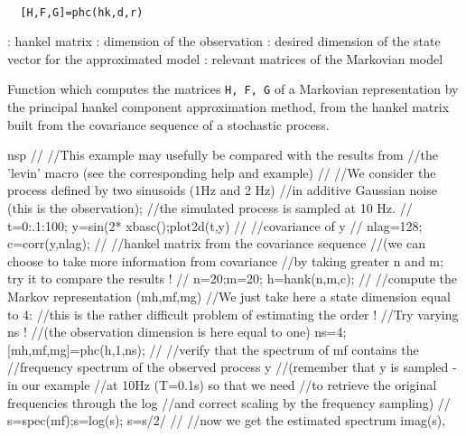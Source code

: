 \begin{mandesc}
   \\ %
\end{mandesc}
\begin{calling_sequence}
\begin{verbatim}
  [H,F,G]=phc(hk,d,r)  
\end{verbatim}
\end{calling_sequence}
\begin{parameters}
  \begin{varlist}
    : hankel matrix
    : dimension of the observation
    : desired dimension of the state vector for the approximated model
    : relevant matrices of the Markovian model
  \end{varlist}
\end{parameters}
\begin{mandescription}
  Function which computes the matrices \verb!H, F, G! of a Markovian 
  representation by the principal hankel
  component approximation method, from the hankel matrix built
  from the covariance sequence of a stochastic process.
\end{mandescription}
\begin{examples}
  \begin{mintednsp}{nsp}
    //
    //This example may usefully be compared with the results from 
    //the 'levin' macro (see the corresponding help and example)
    //
    //We consider the process defined by two sinusoids (1Hz and 2 Hz) 
    //in additive Gaussian noise (this is the observation); 
    //the simulated process is sampled at 10 Hz.
    //
    t=0:.1:100;
    y=sin(2*%
    xbasc();plot2d(t,y)
    //
    //covariance of y
    //
    nlag=128;
    c=corr(y,nlag);
    //
    //hankel matrix from the covariance sequence
    //(we can choose to take more information from covariance
    //by taking greater n and m; try it to compare the results !
    //
    n=20;m=20;
    h=hank(n,m,c);
    //
    //compute the Markov representation (mh,mf,mg)
    //We just take here a state dimension equal to 4:
    //this is the rather difficult problem of estimating the order !
    //Try varying ns ! 
    //(the observation dimension is here equal to one)
    ns=4;
    [mh,mf,mg]=phc(h,1,ns);
    //
    //verify that the spectrum of mf contains the 
    //frequency spectrum of the observed process y
    //(remember that y is sampled -in our example 
    //at 10Hz (T=0.1s) so that we need 
    //to retrieve the original frequencies through the log 
    //and correct scaling by the frequency sampling)
    //
    s=spec(mf);s=log(s);
    s=s/2/%
    //
    //now we get the estimated spectrum
    imag(s),
  \end{mintednsp}
\end{examples}
\begin{manseealso}
\end{manseealso}
